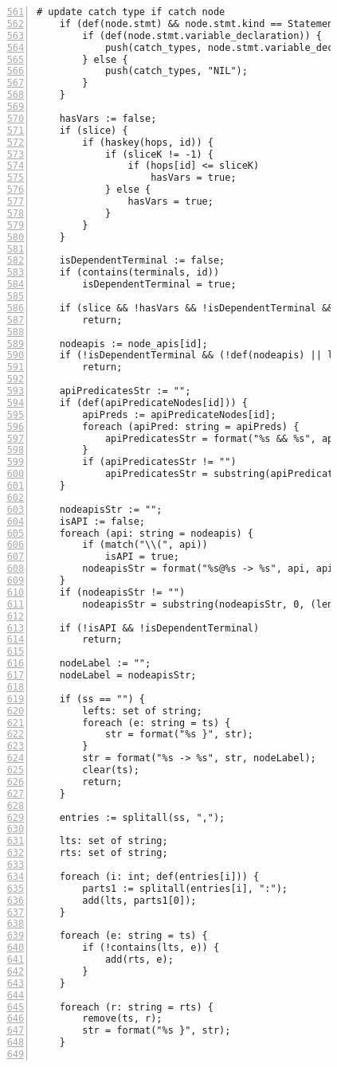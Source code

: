 \begin{figure}[ht!]
\begin{lstlisting}[numbers=left, tabsize=4, escapechar=@, caption={API Usage Mining Analysis},label={lst:aun-code},  firstline = 561, firstnumber = 561, lastline = 621]
	# update catch type if catch node
	if (def(node.stmt) && node.stmt.kind == StatementKind.CATCH) {
	    if (def(node.stmt.variable_declaration)) {
	        push(catch_types, node.stmt.variable_declaration.variable_type.name);    
	    } else {
	        push(catch_types, "NIL");
	    }
	}
	
	hasVars := false;
	if (slice) {
		if (haskey(hops, id)) {
			if (sliceK != -1) {
				if (hops[id] <= sliceK)
					hasVars = true;
			} else {
				hasVars = true;
			}	
		}
	}
	    
	isDependentTerminal := false;
	if (contains(terminals, id))
	    isDependentTerminal = true;
	    
	if (slice && !hasVars && !isDependentTerminal && !hasCatchOrFinally(ss))
	    return;
	    
	nodeapis := node_apis[id];
	if (!isDependentTerminal && (!def(nodeapis) || len(nodeapis) == 0))
	    return;
	    
	apiPredicatesStr := "";
	if (def(apiPredicateNodes[id])) { 
	    apiPreds := apiPredicateNodes[id];
	    foreach (apiPred: string = apiPreds) {
	        apiPredicatesStr = format("%s && %s", apiPredicatesStr, apiPred);
	    }
	    if (apiPredicatesStr != "")
	        apiPredicatesStr = substring(apiPredicatesStr, 4);
	}
	
	nodeapisStr := "";    
	isAPI := false;
	foreach (api: string = nodeapis) {
	    if (match("\\(", api))
	        isAPI = true;
	    nodeapisStr = format("%s@%s -> %s", api, apiPredicatesStr, nodeapisStr);    
	}
	if (nodeapisStr != "")
	    nodeapisStr = substring(nodeapisStr, 0, (len(nodeapisStr) - 4));
	    
	if (!isAPI && !isDependentTerminal) 
	    return;
	    
	nodeLabel := ""; 
	nodeLabel = nodeapisStr; 
	
	if (ss == "") {
	    lefts: set of string;
	    foreach (e: string = ts) {
            str = format("%s }", str);
	    }
	    str = format("%s -> %s", str, nodeLabel);
	    clear(ts);
		return;
	}
		
	entries := splitall(ss, ",");
	
	lts: set of string; 
	rts: set of string;
	
	foreach (i: int; def(entries[i])) {
		parts1 := splitall(entries[i], ":");
		add(lts, parts1[0]);
	}	
	
	foreach (e: string = ts) {
		if (!contains(lts, e)) {
			add(rts, e);
		}
	}
	
	foreach (r: string = rts) {
		remove(ts, r);
		str = format("%s }", str);
	}
	

\end{lstlisting}
\end{figure}

